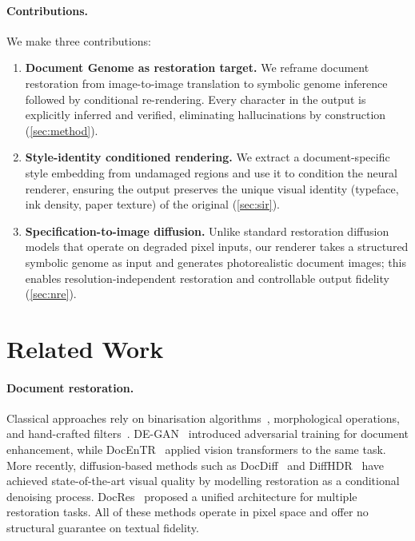 \documentclass[conference]{IEEEtran}
\begin{document}
\paragraph{Contributions.}
We make three contributions:
\begin{enumerate}[leftmargin=*,nosep]
\item \textbf{Document Genome as restoration target.}
  We reframe document restoration from image-to-image translation to symbolic
  genome inference followed by conditional re-rendering. Every character in the
  output is explicitly inferred and verified, eliminating hallucinations by
  construction (\cref{sec:method}).
\item \textbf{Style-identity conditioned rendering.}
  We extract a document-specific style embedding from undamaged regions and use it
  to condition the neural renderer, ensuring the output preserves the unique visual
  identity (typeface, ink density, paper texture) of the original
  (\cref{sec:sir}).
\item \textbf{Specification-to-image diffusion.}
  Unlike standard restoration diffusion models that operate on degraded pixel inputs,
  our renderer takes a structured symbolic genome as input and generates
  photorealistic document images; this enables resolution-independent restoration and
  controllable output fidelity (\cref{sec:nre}).
\end{enumerate}

\section{Related Work}
\label{sec:related}

\paragraph{Document restoration.}
Classical approaches rely on binarisation algorithms~\cite{sauvola2000adaptive,
otsu1979threshold}, morphological operations, and hand-crafted
filters~\cite{he2019doctr}.  DE-GAN~\cite{souibgui2020degan} introduced adversarial
training for document enhancement, while DocEnTR~\cite{souibgui2022docentr} applied
vision transformers to the same task.  More recently, diffusion-based methods such as
DocDiff~\cite{yang2023docdiff} and DiffHDR~\cite{chen2024diffhdr} have achieved
state-of-the-art visual quality by modelling restoration as a conditional denoising
process.  DocRes~\cite{zhang2024docres} proposed a unified architecture for multiple
restoration tasks.  All of these methods operate in pixel space and offer no
structural guarantee on textual fidelity.
\end{document}

